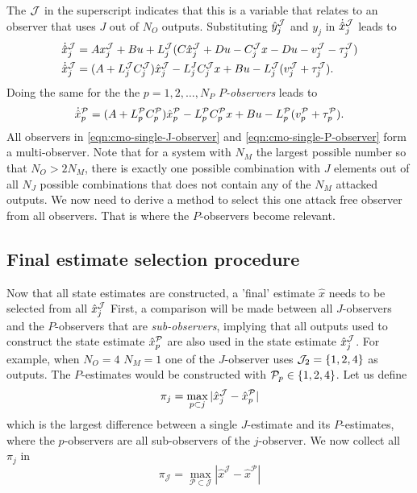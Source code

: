 The $\mathcal{J}$ in the superscript indicates that this is a variable that relates to an observer that uses $J$ out of $N_O$ outputs.
Substituting $\hat{y}_j^{\mathcal{J}}$ and $y_j$ in $\dot{\hat{x}}_j^{\mathcal{J}}$ leads to
\begin{equation}\label{eqn:cmo-single-J-observer}
    \begin{split}
        \dot{\hat{x}}_j^{\mathcal{J}} &= Ax_j^{\mathcal{J}} + Bu + L_j^{\mathcal{J}}(C\hat{x}_j^{\mathcal{J}} + Du - C_j^{\mathcal{J}}x - Du - v_j^{\mathcal{J}} - \tau^{\mathcal{J}}_j) \\
        \dot{\hat{x}}_j^{\mathcal{J}} &= (A + L_j^{\mathcal{J}}C_j^{\mathcal{J}})\hat{x}^{\mathcal{J}}_j - L_j^JC_j^{\mathcal{J}}x + Bu - L_j^{\mathcal{J}}(v_j^{\mathcal{J}} + \tau_j^{\mathcal{J}}). \\
    \end{split}    
\end{equation}
Doing the same for the the $p=1,2,\dots,N_P$ $P$\textit{-observers} leads to
\begin{equation}\label{eqn:cmo-single-P-observer}
    \dot{\hat{x}}_p^{\mathcal{P}} = (A + L_p^{\mathcal{P}}C_p^{\mathcal{P}})\hat{x}_p^{\mathcal{P}} - L_p^{\mathcal{P}}C_p^{\mathcal{P}}x + Bu - L_p^{\mathcal{P}}(v_p^{\mathcal{P}} + \tau_p^{\mathcal{P}}).
\end{equation}
All observers in \eqref{eqn:cmo-single-J-observer} and \eqref{eqn:cmo-single-P-observer} form a multi-observer. Note that for a system with $N_M$ the largest possible number so that $N_O > 2N_M$, there is exactly one possible combination with $J$ elements out of all $N_J$ possible combinations that does not contain any of the $N_M$ attacked outputs. We now need to derive a method to select this one attack free observer from all observers. That is where the $P$-observers become relevant.

\subsection{Final estimate selection procedure}
\label{subsec:estimate-selection}
Now that all state estimates are constructed, a 'final' estimate $\hat{x}$ needs to be selected from all $\hat{x}_j^{\mathcal{J}}$ First, a comparison will be made between all $J$-observers and the $P$-observers that are \textit{sub-observers}, implying that all outputs used to construct the state estimate $\hat{x}_p^{\mathcal{P}}$ are also used in the state estimate $\hat{x}_j^{\mathcal{J}}$. For example, when $N_O=4$ $N_M=1$ one of the $J$-observer uses $\mathcal{J}_2=\{1,2,4\}$ as outputs. The $P$-estimates would be constructed with $\mathcal{P}_p \in \{1,2,4\}$. Let us define 
\begin{equation}\label{eqn:pi-j}
   \pi_{j} = \max_{p \subset j} |\hat{x}^{\mathcal{J}}_{j} - \hat{x}^{\mathcal{P}}_{p}|
\end{equation}
which is the largest difference between a single $J$-estimate and its $P$-estimates, where the $p$-observers are all sub-observers of the $j$-observer. We now collect all $\pi_j$ in
\begin{equation*}
   \pi_{\mathcal{J}} = \max_{\mathcal{P} \subset \mathcal{J}} |\hat{x}^{\mathcal{J}} - \hat{x}^{\mathcal{P}}|
\end{equation*}


